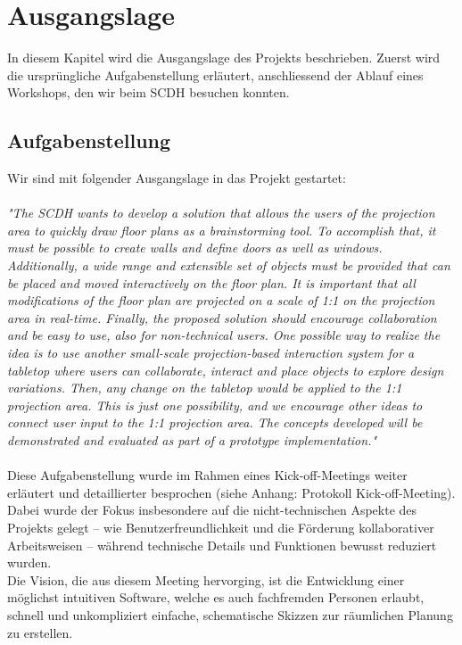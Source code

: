 \section{Ausgangslage}
In diesem Kapitel wird die Ausgangslage des Projekts beschrieben. Zuerst wird die ursprüngliche Aufgabenstellung erläutert, anschliessend der Ablauf eines Workshops, den wir beim SCDH besuchen konnten.

\subsection{Aufgabenstellung}
Wir sind mit folgender Ausgangslage in das Projekt gestartet:\\
\\
\textit{
"The SCDH wants to develop a solution that allows the users of the projection area to quickly draw floor plans as a brainstorming tool. To accomplish that, it must be possible to create walls and define doors as well as windows. Additionally, a wide range and extensible set of objects must be provided that can be placed and moved interactively on the floor plan. It is important that all modifications of the floor plan are projected on a scale of 1:1 on the projection area in real-time. Finally, the proposed solution should encourage collaboration and be easy to use, also for non-technical users. One possible way to realize the idea is to use another small-scale projection-based interaction system for a tabletop where users can collaborate, interact and place objects to explore design variations. Then, any change on the tabletop would be applied to the 1:1 projection area. This is just one possibility, and we encourage other ideas to connect user input to the 1:1 projection area. The concepts developed will be demonstrated and evaluated as part of a prototype implementation."
}
\\
\\
Diese Aufgabenstellung wurde im Rahmen eines Kick-off-Meetings weiter erläutert und detaillierter besprochen (siehe Anhang: Protokoll Kick-off-Meeting). Dabei wurde der Fokus insbesondere auf die nicht-technischen Aspekte des Projekts gelegt – wie Benutzerfreundlichkeit und die Förderung kollaborativer Arbeitsweisen – während technische Details und Funktionen bewusst reduziert wurden.\\

Die Vision, die aus diesem Meeting hervorging, ist die Entwicklung einer möglichst intuitiven Software, welche es auch fachfremden Personen erlaubt, schnell und unkompliziert einfache, schematische Skizzen zur räumlichen Planung zu erstellen.
\pagebreak

